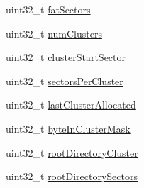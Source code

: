 \begin{DoxyCompactItemize}
uint32\+\_\+t \hyperlink{structafatfs__t_aa2199746eb9e7defbe477e98caf0d596}{fat\+Sectors}
\item 
uint32\+\_\+t \hyperlink{structafatfs__t_a62834f2a8eac0fd41207edec5f010db1}{num\+Clusters}
\item 
uint32\+\_\+t \hyperlink{structafatfs__t_a570c352564500ef194828cae22e3d54b}{cluster\+Start\+Sector}
\item 
uint32\+\_\+t \hyperlink{structafatfs__t_a93c9fdb3a6f2d4f833ff0afe0779af8d}{sectors\+Per\+Cluster}
\item 
uint32\+\_\+t \hyperlink{structafatfs__t_a486695e3e4c3c2335afea7f9c1cc0c9b}{last\+Cluster\+Allocated}
\item 
uint32\+\_\+t \hyperlink{structafatfs__t_a43053a46424b305c37a7cea089ba807a}{byte\+In\+Cluster\+Mask}
\item 
uint32\+\_\+t \hyperlink{structafatfs__t_af2fd51aa04bb8396d298dcbbd5db46cf}{root\+Directory\+Cluster}
\item 
uint32\+\_\+t \hyperlink{structafatfs__t_a3a57b49090ab8dcd151e317038239e67}{root\+Directory\+Sectors}
\end{DoxyCompactItemize}


